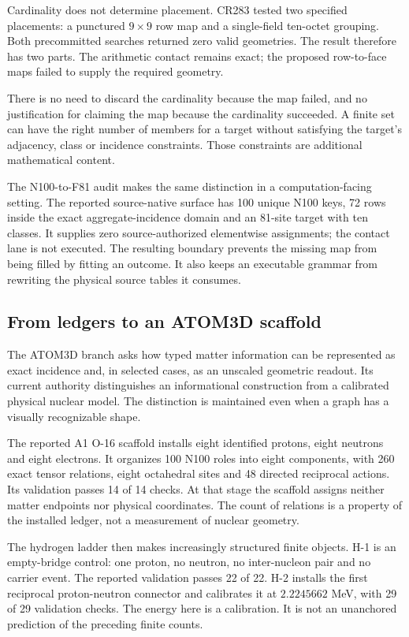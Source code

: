 Cardinality does not determine placement. CR283 tested two specified placements: a punctured $9\times9$ row map and a single-field ten-octet grouping. Both precommitted searches returned zero valid geometries. The result therefore has two parts. The arithmetic contact remains exact; the proposed row-to-face maps failed to supply the required geometry.\cite{viireview}

There is no need to discard the cardinality because the map failed, and no justification for claiming the map because the cardinality succeeded. A finite set can have the right number of members for a target without satisfying the target's adjacency, class or incidence constraints. Those constraints are additional mathematical content.

The N100-to-F81 audit makes the same distinction in a computation-facing setting. The reported source-native surface has 100 unique N100 keys, 72 rows inside the exact aggregate-incidence domain and an 81-site target with ten classes. It supplies zero source-authorized elementwise assignments; the contact lane is not executed. The resulting boundary prevents the missing map from being filled by fitting an outcome. It also keeps an executable grammar from rewriting the physical source tables it consumes.

\subsection{From ledgers to an ATOM3D scaffold}

The ATOM3D branch asks how typed matter information can be represented as exact incidence and, in selected cases, as an unscaled geometric readout. Its current authority distinguishes an informational construction from a calibrated physical nuclear model. The distinction is maintained even when a graph has a visually recognizable shape.\cite{viiatom}

The reported A1 O-16 scaffold installs eight identified protons, eight neutrons and eight electrons. It organizes 100 N100 roles into eight components, with 260 exact tensor relations, eight octahedral sites and 48 directed reciprocal actions. Its validation passes 14 of 14 checks. At that stage the scaffold assigns neither matter endpoints nor physical coordinates. The count of relations is a property of the installed ledger, not a measurement of nuclear geometry.

The hydrogen ladder then makes increasingly structured finite objects. H-1 is an empty-bridge control: one proton, no neutron, no inter-nucleon pair and no carrier event. The reported validation passes 22 of 22. H-2 installs the first reciprocal proton-neutron connector and calibrates it at $2.2245662$ MeV, with 29 of 29 validation checks. The energy here is a calibration. It is not an unanchored prediction of the preceding finite counts.

